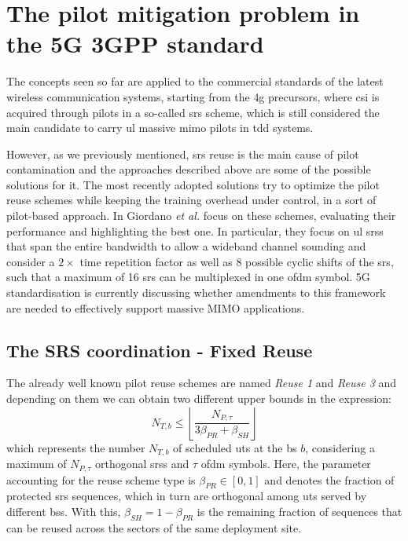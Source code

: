 \documentclass[11pt]{book}
\begin{document}
\section{The pilot mitigation problem in the 5G 3GPP standard}
The concepts seen so far are applied to the commercial standards of the latest wireless communication systems, starting from the \gls{4g} precursors, where \gls{csi} is acquired through pilots in a so-called \gls{srs} scheme, which is still considered the main candidate to carry \gls{ul} massive \gls{mimo} pilots in \gls{tdd} systems.

However, as we previously mentioned, \gls{srs} reuse is the main cause of pilot contamination and the approaches described above are some of the possible solutions for it. The most recently adopted solutions try to optimize the pilot reuse schemes while keeping the training overhead under control, in a sort of pilot-based approach. In \cite{Giordano} Giordano \textit{et al.} focus on these schemes, evaluating their performance and highlighting the best one. In particular, they focus on \gls{ul} \gls{srs}s that span the entire bandwidth to allow a wideband channel sounding and consider a $2\times$ time repetition factor as well as 8 possible cyclic shifts of the \gls{srs}, such that a maximum of 16 \gls{srs} can be multiplexed in one \gls{ofdm} symbol. 5G standardisation is currently discussing whether amendments to this framework are needed to effectively support massive MIMO applications.

\subsection{The SRS coordination - Fixed Reuse}
The already well known pilot reuse schemes are named \textit{Reuse 1} and \textit{Reuse 3} and depending on them we can obtain two different upper bounds in the expression:
\begin{equation}
  N_{T,b} \leq \left\lfloor \frac{N_{P,\tau}}{3\beta_{PR}+\beta_{SH}} \right\rfloor
\end{equation}
which represents the number $N_{T,b}$ of scheduled \gls{ut}s at the \gls{bs} $b$, considering a maximum of $N_{P,\tau}$ orthogonal \gls{srs}s and $\tau$ \gls{ofdm} symbols. Here, the parameter accounting for the reuse scheme type is $\beta_{PR} \in [0,1]$ and denotes the fraction of protected \gls{srs} sequences, which in turn are orthogonal among \gls{ut}s served by different \gls{bs}s. With this, $\beta_{SH} = 1 - \beta_{PR}$ is the remaining fraction of sequences that can be reused across the sectors of the same deployment site.
\end{document}
